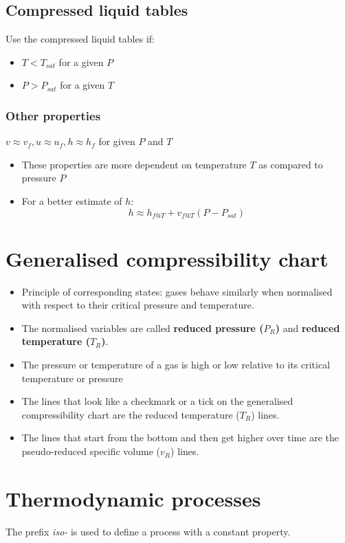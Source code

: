 \documentclass[11pt]{article}
\begin{document}
\subsection{Compressed liquid tables}
\label{sec:org98e2b3c}
Use the compressed liquid tables if:
\begin{itemize}
\item \(T < T_{sat}\) for a given \(P\)
\item \(P > P_{sat}\) for a given \(T\)
\end{itemize}
\subsubsection{Other properties}
\label{sec:orgd527cc7}
\(v \approx v_f, u \approx u_f, h \approx h_f\) for given \(P\) and \(T\)
\begin{itemize}
\item These properties are more dependent on temperature \(T\) as compared to pressure \(P\)
\item For a better estimate of \(h\):
\[h \approx h_{f@T} + v_{f@T} (P - P_{sat})\]
\end{itemize}
\section{Generalised compressibility chart}
\label{sec:org3d35273}
\begin{itemize}
\item Principle of corresponding states: gases behave similarly when normalised with respect to their critical pressure and temperature.
\item The normalised variables are called \textbf{reduced pressure (\(P_R\))} and \textbf{reduced temperature (\(T_R\))}.
\item The pressure or temperature of a gas is high or low relative to its critical temperature or pressure
\item The lines that look like a checkmark or a tick on the generalised compressibility chart are the reduced temperature (\(T_R\)) lines.
\item The lines that start from the bottom and then get higher over time are the pseudo-reduced specific volume (\(v_R\)) lines.
\end{itemize}

\newpage
\section{Thermodynamic processes}
\label{sec:org5d4091c}
The prefix \emph{iso-} is used to define a process with a constant property.
\end{document}
